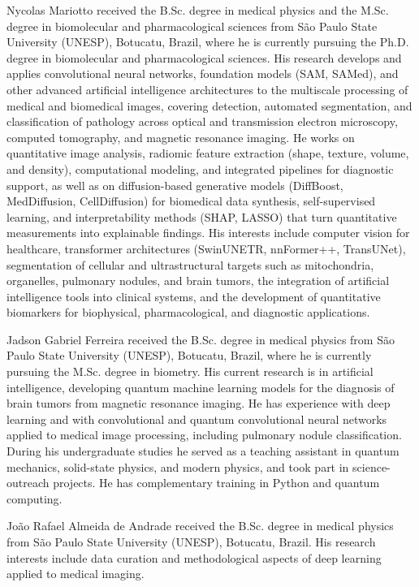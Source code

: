 \documentclass{ieeeaccess}
\begin{document}
\begin{IEEEbiographynophoto}{Nycolas Mariotto}
received the B.Sc. degree in medical physics and the M.Sc. degree in biomolecular and pharmacological sciences from S\~ao Paulo State University (UNESP), Botucatu, Brazil, where he is currently pursuing the Ph.D. degree in biomolecular and pharmacological sciences. His research develops and applies convolutional neural networks, foundation models (SAM, SAMed), and other advanced artificial intelligence architectures to the multiscale processing of medical and biomedical images, covering detection, automated segmentation, and classification of pathology across optical and transmission electron microscopy, computed tomography, and magnetic resonance imaging. He works on quantitative image analysis, radiomic feature extraction (shape, texture, volume, and density), computational modeling, and integrated pipelines for diagnostic support, as well as on diffusion-based generative models (DiffBoost, MedDiffusion, CellDiffusion) for biomedical data synthesis, self-supervised learning, and interpretability methods (SHAP, LASSO) that turn quantitative measurements into explainable findings. His interests include computer vision for healthcare, transformer architectures (SwinUNETR, nnFormer++, TransUNet), segmentation of cellular and ultrastructural targets such as mitochondria, organelles, pulmonary nodules, and brain tumors, the integration of artificial intelligence tools into clinical systems, and the development of quantitative biomarkers for biophysical, pharmacological, and diagnostic applications.
\end{IEEEbiographynophoto}
\begin{IEEEbiographynophoto}{Jadson Gabriel Ferreira}
received the B.Sc. degree in medical physics from S\~ao Paulo State University (UNESP), Botucatu, Brazil, where he is currently pursuing the M.Sc. degree in biometry. His current research is in artificial intelligence, developing quantum machine learning models for the diagnosis of brain tumors from magnetic resonance imaging. He has experience with deep learning and with convolutional and quantum convolutional neural networks applied to medical image processing, including pulmonary nodule classification. During his undergraduate studies he served as a teaching assistant in quantum mechanics, solid-state physics, and modern physics, and took part in science-outreach projects. He has complementary training in Python and quantum computing.
\end{IEEEbiographynophoto}
\begin{IEEEbiographynophoto}{Jo\~ao Rafael Almeida de Andrade}
received the B.Sc. degree in medical physics from S\~ao Paulo State University (UNESP), Botucatu, Brazil. His research interests include data curation and methodological aspects of deep learning applied to medical imaging.
\end{IEEEbiographynophoto}
\end{document}
